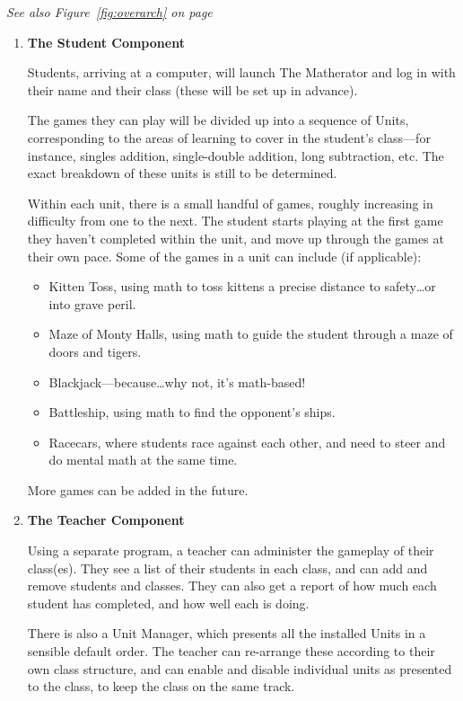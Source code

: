 \documentclass[11pt,a4paper,twoside]{report}
\begin{document}
\emph{See also Figure~\ref{fig:overarch} on page~\pageref{fig:overarch}}

\begin{enumerate}


\item  \textbf{The Student Component}

Students, arriving at a computer, will launch The Matherator and log in with their name and their class (these will be set up in advance).

The games they can play will be divided up into a sequence of Units, corresponding to the areas of learning to cover in the student’s class—for instance, singles addition, single-double addition, long subtraction, etc. The exact breakdown of these units is still to be determined.

Within each unit, there is a small handful of games, roughly increasing in difficulty from one to the next. The student starts playing at the first game they haven’t completed within the unit, and move up through the games at their own pace. Some of the games in a unit can include (if applicable):
    \begin{itemize}
        \item Kitten Toss, using math to toss kittens a precise distance to safety…or into grave peril.
        \item Maze of Monty Halls, using math to guide the student through a maze of doors and tigers.
        \item Blackjack—because…why not, it’s math-based!
        \item Battleship, using math to find the opponent’s ships.
        \item Racecars, where students race against each other, and need to steer and do mental math at the same time.
    \end{itemize}
    
More games can be added in the future.



\item  \textbf{The Teacher Component}

Using a separate program, a teacher can administer the gameplay of their class(es). They see a list of their students in each class, and can add and remove students and classes. They can also get a report of how much each student has completed, and how well each is doing.

There is also a Unit Manager, which presents all the installed Units in a sensible default order. The teacher can re-arrange these according to their own class structure, and can enable and disable individual units as presented to the class, to keep the class on the same track.


\end{enumerate}
\end{document}
